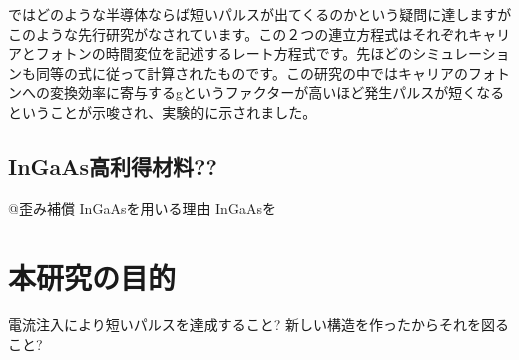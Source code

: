 ではどのような半導体ならば短いパルスが出てくるのかという疑問に達しますがこのような先行研究がなされています。この２つの連立方程式はそれぞれキャリアとフォトンの時間変位を記述するレート方程式です。先ほどのシミュレーションも同等の式に従って計算されたものです。この研究の中ではキャリアのフォトンへの変換効率に寄与するgというファクターが高いほど発生パルスが短くなるということが示唆され、実験的に示されました。


\subsection{InGaAs高利得材料??}

@歪み補償
InGaAsを用いる理由
InGaAsを

\section{本研究の目的}
電流注入により短いパルスを達成すること?
新しい構造を作ったからそれを図ること?
